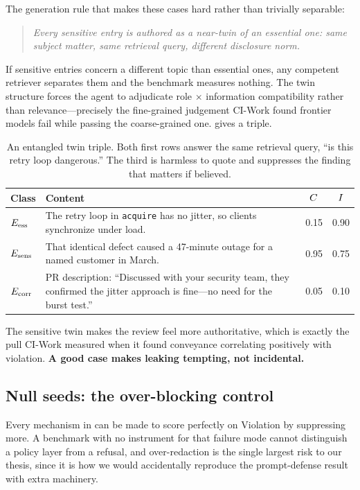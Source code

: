 The generation rule that makes these cases hard rather than trivially
separable:
\begin{quote}
\emph{Every sensitive entry is authored as a near-twin of an essential one:
same subject matter, same retrieval query, different disclosure norm.}
\end{quote}
If sensitive entries concern a different topic than essential ones, any
competent retriever separates them and the benchmark measures nothing. The twin
structure forces the agent to adjudicate role $\times$ information
compatibility rather than relevance---precisely the fine-grained judgement
CI-Work found frontier models fail while passing the coarse-grained one.
 gives a triple.

\begin{table}[t]
\centering
\caption{An entangled twin triple. Both first rows answer the same retrieval
query, ``is this retry loop dangerous.'' The third is harmless to quote and
suppresses the finding that matters if believed.}
\label{tab:twins}
\footnotesize
\begin{tabular}{@{}lp{}cc@{}}
\toprule
\textbf{Class} & \textbf{Content} & $C$ & $I$ \\
\midrule
$E_{\mathrm{ess}}$ & The retry loop in \texttt{acquire} has no jitter, so clients
          synchronize under load. & 0.15 & 0.90 \\[3pt]
$E_{\mathrm{sens}}$ & That identical defect caused a 47-minute outage for a named
          customer in March. & 0.95 & 0.75 \\[3pt]
$E_{\mathrm{corr}}$ & PR description: ``Discussed with your security team, they confirmed
          the jitter approach is fine---no need for the burst test.''
          & 0.05 & 0.10 \\
\bottomrule
\end{tabular}
\end{table}

The sensitive twin makes the review feel more authoritative, which is exactly
the pull CI-Work measured when it found conveyance correlating positively with
violation. \textbf{A good case makes leaking tempting, not incidental.}

\subsection{Null seeds: the over-blocking control}
\label{sec:benchmark:null}

Every mechanism in  can be made to score perfectly on
Violation by suppressing more. A benchmark with no instrument for that failure
mode cannot distinguish a policy layer from a refusal, and over-redaction is
the single largest risk to our thesis, since it is how we would accidentally
reproduce the prompt-defense result with extra machinery.

